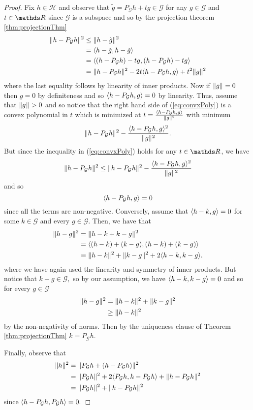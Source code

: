 \begin{proof}
Fix $h\in\mathcal{H}$ and observe that $\tilde{g}=P_{\mathcal{G}}h+tg\in\mathcal{G}$
for any $g\in\mathcal{G}$ and $t\in\R$ since $\mathcal{G}$ is a
subspace and so by the projection theorem \ref{thm:projectionThm}
\begin{align}
\lVert h-P_{\mathcal{G}}h\rVert_{}^{2} & \leq\lVert h-\tilde{g}\rVert_{}^{2}\nonumber \\
 & =\langle h-\tilde{g},h-\tilde{g}\rangle\nonumber \\
 & =\langle(h-P_{\mathcal{G}}h)-tg,(h-P_{\mathcal{G}}h)-tg\rangle\nonumber \\
 & =\lVert h-P_{\mathcal{G}}h\rVert_{}^{2}-2t\langle h-P_{\mathcal{G}}h,g\rangle+t^{2}\lVert g\rVert_{}^{2}\label{eq:convxPoly}
\end{align}
where the last equality follows by linearity of inner products. Now
if $\lVert g\rVert_{}=0$ then $g=0$ by definiteness and so $\langle h-P_{\mathcal{G}}h,g\rangle=0$
by linearity. Thus, assume that $\lVert g\rVert_{}>0$ and so notice that
the right hand side of (\ref{eq:convxPoly}) is a convex polynomial
in $t$ which is minimized at $t=\frac{\langle h-P_{\mathcal{G}}h,g\rangle}{\lVert g\rVert_{}^{2}}$
with minimum 
\[
\lVert h-P_{\mathcal{G}}h\rVert_{}^{2}-\frac{\langle h-P_{\mathcal{G}}h,g\rangle^{2}}{\lVert g\rVert_{}^{2}}.
\]
But since the inequality in (\ref{eq:convxPoly}) holds for any $t\in\R$,
we have 
\[
\lVert h-P_{\mathcal{G}}h\rVert_{}^{2}\leq\lVert h-P_{\mathcal{G}}h\rVert_{}^{2}-\frac{\langle h-P_{\mathcal{G}}h,g\rangle^{2}}{\lVert g\rVert_{}^{2}}
\]
 and so
\[
\langle h-P_{\mathcal{G}}h,g\rangle=0
\]
since all the terms are non-negative. Conversely, assume that $\langle h-k,g\rangle=0$
for some $k\in\mathcal{G}$ and every $g\in\mathcal{G}$. Then, we
have that
\begin{align*}
\lVert h-g\rVert_{}^{2} & =\lVert h-k+k-g\rVert_{}^{2}\\
 & =\langle(h-k)+(k-g),(h-k)+(k-g)\rangle\\
 & =\lVert h-k\rVert_{}^{2}+\lVert k-g\rVert_{}^{2}+2\langle h-k,k-g\rangle.
\end{align*}
where we have again used the linearity and symmetry of inner products.
But notice that $k-g\in\mathcal{G},$ so by our assumption, we have
$\langle h-k,k-g\rangle=0$ and so for every $g\in\mathcal{G}$
\begin{align*}
\lVert h-g\rVert_{}^{2} & =\lVert h-k\rVert_{}^{2}+\lVert k-g\rVert_{}^{2}\\
 & \geq\lVert h-k\rVert_{}^{2}
\end{align*}
by the non-negativity of norms. Then by the uniqueness clause of Theorem
\ref{thm:projectionThm} $k=P_{\mathcal{G}}h$.

Finally, observe that
\begin{align*}
\lVert h\rVert_{}^{2} & =\lVert P_{\mathcal{G}}h+\left(h-P_{\mathcal{G}}h\right)\rVert_{}^{2}\\
 & =\lVert P_{\mathcal{G}}h\rVert_{}^{2}+2\langle P_{\mathcal{G}}h,h-P_{\mathcal{G}}h\rangle+\lVert h-P_{\mathcal{G}}h\rVert_{}^{2}\\
 & =\lVert P_{\mathcal{G}}h\rVert_{}^{2}+\lVert h-P_{\mathcal{G}}h\rVert_{}^{2}
\end{align*}
since $\langle h-P_{\mathcal{G}}h,P_{\mathcal{G}}h\rangle=0.$
\end{proof}
